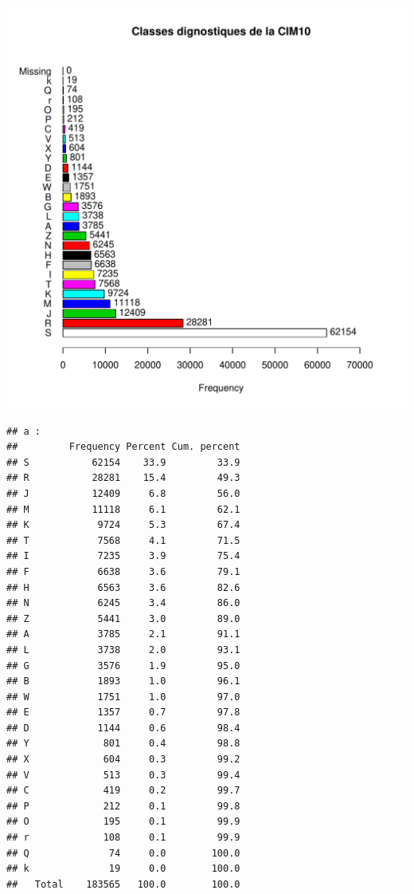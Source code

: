 \documentclass[12pt,english,french,twoside]{report}\usepackage[]{graphicx}\usepackage[]{color}
\makeatletter
\def\maxwidth{ %
  \ifdim\Gin@nat@width>\linewidth
    \linewidth
  \else
    \Gin@nat@width
  \fi
}
\newenvironment{kframe}{%
 \def\at@end@of@kframe{}%
 \ifinner\ifhmode%
  \def\at@end@of@kframe{\end{minipage}}%
  \begin{minipage}{\columnwidth}%
 \fi\fi%
 \def\FrameCommand##1{\hskip\@totalleftmargin \hskip-\fboxsep
 \colorbox{shadecolor}{##1}\hskip-\fboxsep
     \hskip-\linewidth \hskip-\@totalleftmargin \hskip\columnwidth}%
 \MakeFramed {\advance\hsize-\width
   \@totalleftmargin\z@ \linewidth\hsize
   \@setminipage}}%
 {\par\unskip\endMakeFramed%
 \at@end@of@kframe}
\newenvironment{knitrout}{}{} %
\makeatother
\begin{document}
\begin{knitrout}
\color{fgcolor}
\includegraphics[width=\maxwidth]{figure/class_cim10} 
\begin{kframe}\begin{verbatim}
## a :  
##         Frequency Percent Cum. percent
## S           62154    33.9         33.9
## R           28281    15.4         49.3
## J           12409     6.8         56.0
## M           11118     6.1         62.1
## K            9724     5.3         67.4
## T            7568     4.1         71.5
## I            7235     3.9         75.4
## F            6638     3.6         79.1
## H            6563     3.6         82.6
## N            6245     3.4         86.0
## Z            5441     3.0         89.0
## A            3785     2.1         91.1
## L            3738     2.0         93.1
## G            3576     1.9         95.0
## B            1893     1.0         96.1
## W            1751     1.0         97.0
## E            1357     0.7         97.8
## D            1144     0.6         98.4
## Y             801     0.4         98.8
## X             604     0.3         99.2
## V             513     0.3         99.4
## C             419     0.2         99.7
## P             212     0.1         99.8
## O             195     0.1         99.9
## r             108     0.1         99.9
## Q              74     0.0        100.0
## k              19     0.0        100.0
##   Total    183565   100.0        100.0
\end{verbatim}
\end{kframe}
\end{knitrout}
\end{document}
